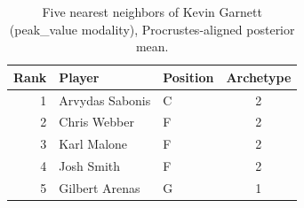 \begin{table}[htbp]
  \centering\small
  \begin{tabular}{rllc}
    \toprule
    Rank & Player & Position & Archetype \\
    \midrule
    1 & Arvydas Sabonis & C & 2 \\
    2 & Chris Webber & F & 2 \\
    3 & Karl Malone & F & 2 \\
    4 & Josh Smith & F & 2 \\
    5 & Gilbert Arenas & G & 1 \\
    \bottomrule
  \end{tabular}
  \caption{Five nearest neighbors of Kevin Garnett (peak_value modality), Procrustes-aligned posterior mean.}
  \label{tab:Kevin_Garnett_neighbors_peak_value}
\end{table}

